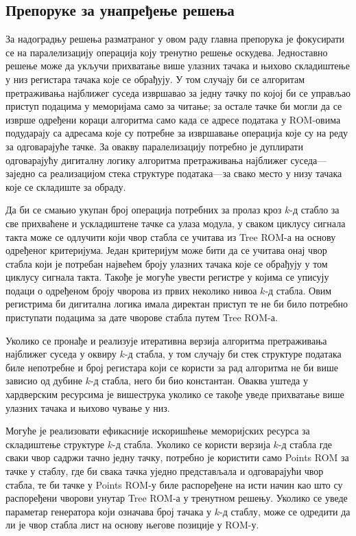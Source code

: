 \documentclass[master]{finthesis}
\newcommand*{\kd}{\texorpdfstring{$k$}{k}-д }
\begin{document}
\subsection{Препоруке за унапређење решења}

За надоградњу решења разматраног у овом  раду главна препорука је фокусирати се на паралелизацију операција коју тренутно решење оскудева. Једноставно решење може да укључи прихватање више улазних тачака и њихово складиштење у низ регистара тачака које се обрађују. У том случају би се алгоритам претраживања најближег суседа извршавао за једну тачку по којој би се управљао приступ подацима у меморијама само за читање; за остале тачке би могли да се изврше одређени кораци алгоритма само када се адресе података у ROM-овима подударају са адресама које су потребне за извршавање операција које су на реду за одговарајуће тачке. За овакву паралелизацију потребно је дуплирати одговарајућу дигиталну логику алгоритма претраживања најближег суседа---заједно са реализацијом стека структуре података---за свако место у низу тачака које се складиште за обраду.

Да би се смањио укупан број операција потребних за пролаз кроз \kd стабло за све прихваћене и ускладиштене тачке са улаза модула, у сваком циклусу сигнала такта може се одлучити који чвор стабла се учитава из Tree ROM-а на основу одређеног критеријума. Један критеријум може бити да се учитава онај чвор стабла који је потребан највећем броју улазних тачака које се обрађују у том циклусу сигнала такта. Такође је могуће увести регистре у којима се уписују подаци о одређеном броју чворова из првих неколико нивоа \kd стабла. Овим регистрима би дигитална логика имала директан приступ те не би било потребно приступати подацима за дате чворове стабла путем Tree ROM-а.

Уколико се пронађе и реализује итеративна верзија алгоритма претраживања најближег суседа у оквиру \kd стабла, у том случају би стек структуре података биле непотребне и број регистара који се користи за рад алгоритма не би више зависио од дубине \kd стабла, него би био константан. Оваква уштеда у хардверским ресурсима је вишеструка уколико се такође уведе прихватање више улазних тачака и њихово чување у низ.

Могуће је реализовати ефикасније искоришћење меморијских ресурса за складиштење структуре \kd стабла. Уколико се користи верзија \kd стабла где сваки чвор садржи тачно једну тачку, потребно је користити само Points ROM за тачке у стаблу, где би свака тачка уједно представљала и одговарајући чвор стабла, те би тачке у Points ROM-у биле распоређене на исти начин као што су распоређени чворови унутар Tree ROM-а у тренутном решењу. Уколико се уведе параметар генератора који означава број тачака у \kd стаблу, може се одредити да ли је чвор стабла лист на основу његове позиције у ROM-у.
\end{document}
